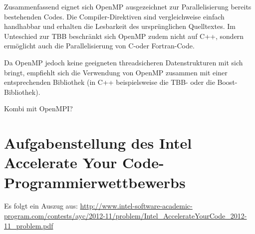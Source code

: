 \documentclass[11pt]{scrartcl}
\begin{document}
Zusammenfassend eignet sich OpenMP ausgezeichnet zur Parallelisierung bereits besteh\-enden Codes. Die Compiler-Direktiven sind vergleichweise einfach handhabbar und erhalten die Lesbarkeit des ursprünglichen Quelltextes. Im Unteschied zur TBB beschränkt sich OpenMP zudem nicht auf C++, sondern ermöglicht auch die Parallelisierung von C-oder Fortran-Code.

Da OpenMP jedoch keine geeigneten threadsicheren Datenstrukturen mit sich bringt, empfiehlt sich die Verwendung von OpenMP zusammen mit einer entsprechenden Bibliothek (in C++ beispielsweise die TBB- oder die Boost-Bibliothek).

Kombi mit OpenMPI?

\pagebreak %

\fancyhead[R]{}

\thispagestyle{empty}

\renewcommand*{\biburlprefix}{(URL: }
\renewcommand*{\biburlsuffix}{)}

\pagebreak
{} %


\appendix

\section{Aufgabenstellung des Intel Accelerate Your Code-Programmierwettbewerbs}

\label{intel_ayc_problem}

Es folgt ein Auszug aus:
\url{http://www.intel-software-academic-program.com/contests/ayc/2012-11/problem/Intel_AccelerateYourCode_2012-11_problem.pdf}
\end{document}
